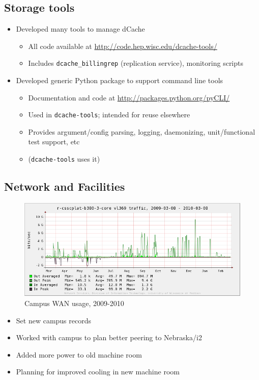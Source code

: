 \documentclass{beamer}
\begin{document}
\subsection{Storage tools}
\begin{frame}
\begin{itemize}
	\item Developed many tools to manage dCache
	\begin{itemize}
		\item All code available at \url{http://code.hep.wisc.edu/dcache-tools/}
		\item Includes {\tt dcache\_billingrep} (replication service), monitoring scripts
	\end{itemize}
	\item Developed generic Python package to support command line tools
	\begin{itemize}
		\item Documentation and code at \url{http://packages.python.org/pyCLI/}
		\item Used in {\tt dcache-tools}; intended for reuse elsewhere
		\item Provides argument/config parsing, logging, daemonizing, unit/functional test support, etc
		\item ({\tt dcache-tools} uses it)
	\end{itemize}
\end{itemize}
\end{frame}

\subsection{Network and Facilities}
\begin{frame}
\begin{figure}
	\includegraphics[width=\textwidth]{Graphics/network-1yr.png}
	\caption{Campus WAN usage, 2009-2010}
\end{figure}

\begin{itemize}
	\item Set new campus records
	\item Worked with campus to plan better peering to Nebraska/i2
	\item Added more power to old machine room
	\item Planning for improved cooling in new machine room
\end{itemize}
\end{frame}
\end{document}
